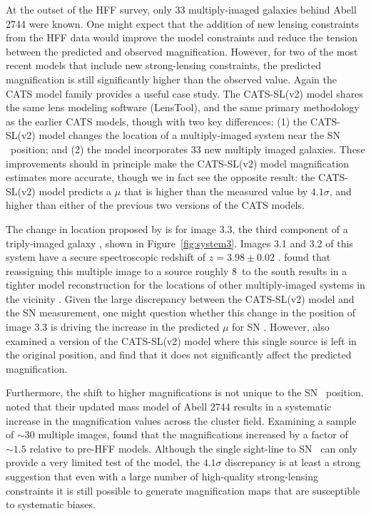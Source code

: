At the outset of the HFF survey, only 33 multiply-imaged galaxies
behind Abell 2744 were known.  One might expect that the addition of
new lensing constraints from the HFF data would improve the model
constraints and reduce the tension between the predicted and observed
magnification.  However, for two of the most recent
models \citep{Jauzac:2014c,Lam:2014} that include new strong-lensing
constraints, the predicted magnification is still significantly higher
than the observed value.  Again the CATS model family provides a
useful case study.  The CATS-SL(v2) model \citep[from][]{Jauzac:2014c}
shares the same lens modeling software (LensTool), and the same
primary methodology as the earlier CATS models, though with
two key differences:  (1) the CATS-SL(v2) model changes the location of a
multiply-imaged system near the SN \tomas\ position; and (2) the model
incorporates 33 new multiply imaged galaxies.  These improvements
should in principle make the CATS-SL(v2) model magnification estimates
more accurate, though we in fact see the opposite result: the
CATS-SL(v2) model predicts a $\mu$ that is higher than the measured
value by $4.1\sigma$, and higher than either of the previous
two versions of the CATS models.

The change in location proposed by \citet{Jauzac:2014c} is for image
3.3, the third component of a triply-imaged
galaxy \citep{Merten:2011}, shown in Figure~\ref{fig:system3}.  Images
3.1 and 3.2 of this system have a secure spectroscopic redshift of
$z=3.98\pm0.02$ \citep{Johnson:2014}. \citet{Jauzac:2014c} found that
reassigning this multiple image to a source roughly 8\arcsec\ to the
south results in a tighter model reconstruction for the locations of
other multiply-imaged systems in the vicinity \citep[though][argue
against the reassignment based on the colors of the two sources in
question]{Lam:2014}.  Given the large discrepancy between the
CATS-SL(v2) model and the SN measurement, one might question whether
this change in the position of image 3.3 is driving the increase in
the predicted $\mu$ for SN \tomas. However, \citet{Jauzac:2014c} also
examined a version of the CATS-SL(v2) model where this single source
is left in the original position, and find that it does not
significantly affect the predicted magnification.

Furthermore, the shift to higher magnifications is not unique to the
SN \tomas\ position.  \citet{Jauzac:2014c} noted that their updated
mass model of Abell 2744 results in a systematic increase in the
magnification values across the cluster field. Examining a sample of
$\sim$30 multiple images, \citeauthor{Jauzac:2014c} found that the
magnifications increased by a factor of $\sim1.5$ relative to pre-HFF
models.  Although the single sight-line to SN \tomas\ can
only provide a very limited test of the model,
the $4.1\sigma$ discrepancy is at least a strong suggestion
that even with a large number of high-quality strong-lensing
constraints it is still possible to generate magnification
maps that are susceptible to systematic biases.

